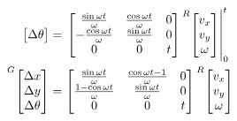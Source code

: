 \begin{align*}
{\begin{bmatrix}
    \Delta \theta
  \end{bmatrix}} &=
  \left.\begin{bmatrix}
     \frac{\sin\omega t}{\omega} & \frac{\cos\omega t}{\omega} & 0 \\
    -\frac{\cos\omega t}{\omega} & \frac{\sin\omega t}{\omega} & 0 \\
    0 & 0 & t
  \end{bmatrix}
  \prescript{R}{}{\begin{bmatrix}
    v_x \\
    v_y \\
    \omega
  \end{bmatrix}} \right|_0^t \\
  \prescript{G}{}{\begin{bmatrix}
    \Delta x \\
    \Delta y \\
    \Delta \theta
  \end{bmatrix}} &=
  \begin{bmatrix}
    \frac{\sin\omega t}{\omega} & \frac{\cos\omega t - 1}{\omega} & 0 \\
    \frac{1 - \cos\omega t}{\omega} & \frac{\sin\omega t}{\omega} & 0 \\
    0 & 0 & t
  \end{bmatrix}
  \prescript{R}{}{\begin{bmatrix}
    v_x \\
    v_y \\
    \omega
  \end{bmatrix}}
\end{align*}

